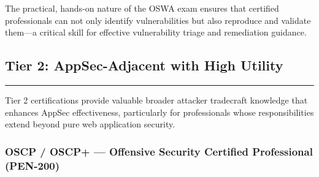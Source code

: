 \documentclass[11pt,letterpaper]{article}
\begin{document}
The practical, hands-on nature of the OSWA exam ensures that certified professionals can not only identify vulnerabilities but also reproduce and validate them---a critical skill for effective vulnerability triage and remediation guidance.

\subsection{Tier 2: AppSec-Adjacent with High Utility}

\textcolor{tier2color}{\rule{\linewidth}{2pt}}

Tier 2 certifications provide valuable broader attacker tradecraft knowledge that enhances AppSec effectiveness, particularly for professionals whose responsibilities extend beyond pure web application security.

\subsubsection{OSCP / OSCP+ --- Offensive Security Certified Professional (PEN-200)}
\end{document}
